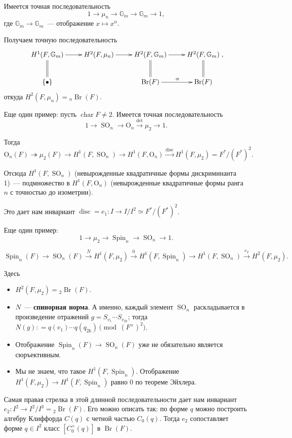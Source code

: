 \documentclass[a4paper]{article}
\DeclareMathOperator{\Br}{Br}
\DeclareMathOperator{\fchar}{char}
\DeclareMathOperator{\SO}{SO}
\DeclareMathOperator{\Spin}{Spin}
\DeclareMathOperator{\disc}{disc}
\renewcommand{\O}{\mathrm{O}}
\newcommand{\term}{\textbf}
\newcommand{\dfn}{\mathrel{\mathop:}=}
\newcommand{\isom}{\simeq}
\theoremstyle{definition}
\begin{document}
Имеется точная последовательность
\[ 1 \to \mu_n \to \mathbb{G}_m \to \mathbb{G}_m \to 1, \]
где $\mathbb{G}_m \to \mathbb{G}_m$~--- отображение $x \mapsto x^n$.

Получаем точную последовательность
\[ \xymatrix{ H^1 (F,\mathbb{G}_m) \ar[r]\ar@{=}[d] & H^2 (F,\mu_n)
  \ar[r] & H^2 (F,\mathbb{G}_m) \ar[r]\ar@{=}[d] & H^2
  (F,\mathbb{G}_m)\ar@{=}[d] \\
\{ \bullet \} & & \Br (F) \ar[r]^{\cdot n} & \Br (F) }, \]
откуда
$H^2 (F,\mu_n) = {}_n \Br (F)$.

Еще один пример: пусть $\fchar F \ne 2$. Имеется точная последовательность
\[ 1 \to \SO_n \to \O_n \xrightarrow{\det} \mu_2 \to 1. \]

Тогда
\[ \O_n (F) \twoheadrightarrow \mu_2 (F) \to H^1 (F,\SO_n) \to H^1 (F,\O_n) \xrightarrow{\disc} H^1 (F,\mu_2)=F^*/(F^*)^2. \]

Отсюда $H^1 (F,\SO_n)$ (невырожденные квадратичные формы дискриминанта
1)~--- подмножество в $H^1 (F,\O_n)$ (невырожденные квадратичные формы
ранга $n$ с точностью до изометрии).

Это дает нам инвариант $\disc=e_1\colon I\to I/I^2\isom F^*/(F^*)^2$.

Еще один пример:
\[ 1 \to \mu_2 \to \Spin_n \to \SO_n \to 1. \]

\[ \Spin_n (F) \to \SO_n (F) \xrightarrow{N} H^1 (F,\mu_2) \xrightarrow{0} H^1 (F,\Spin_n) \to H^1 (F,\SO_n) \xrightarrow{e_2} H^2 (F,\mu_2). \]

Здесь
\begin{itemize}
\item $H^2 (F,\mu_2) = {}_2 \Br (F)$.

\item $N$~--- \term{спинорная норма}. А именно, каждый элемент $\SO_n$
  раскладывается в произведение отражений $g = S_{v_1} \cdots
  S_{v_{2k}}$; тогда $N(g) \dfn q (v_1) \cdots q (q_{2k})
  \pmod{(F^\times)^2}$.

\item Отображение $\Spin_n(F)\to\SO_n(F)$ уже не обязательно является
  сюръективным.

\item Мы не знаем, что такое $H^1(F,\Spin_n)$. Отображение
  $H^1(F,\mu_2)\to H^1(F,\Spin_n)$ равно  $0$ по теореме Эйхлера.
\end{itemize}

Самая правая стрелка в этой длинной последовательности дает нам инвариант
$e_2\colon I^2 \to I^2 / I^3 = {}_2 \Br (F)$. Его можно описать так:
по форме $q$ можно построить алгебру Клиффорда $C(q)$ с четной частью
$C_0(q)$. Тогда $e_2$ сопоставляет форме $q\in I^2$ класс $[C^+_0(q)]$
в $\Br(F)$.
\end{document}

